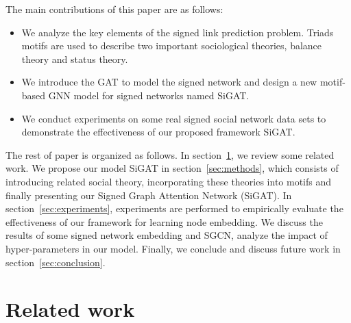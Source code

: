 \documentclass[runningheads]{llncs}
\begin{document}
The main contributions of this paper are as follows:

\begin{itemize}
    \item We analyze the key elements of the signed link prediction problem. Triads motifs are used to describe two important sociological theories, \ie balance theory and status theory.
    \item We introduce the GAT to model the signed network and design a new motif-based GNN model for signed networks named SiGAT.
    \item We conduct experiments on some real signed social network data sets to demonstrate the effectiveness of our proposed framework SiGAT.
\end{itemize}

The rest of paper is organized as follows. In section~\ref{sec:related_work}, we review some related work.
We propose our model SiGAT in section~\ref{sec:methods}, which consists of introducing related social theory, incorporating these theories into motifs and finally presenting our Signed Graph Attention Network (SiGAT).
In section~\ref{sec:experiments}, experiments are performed to empirically evaluate the effectiveness of our framework for learning node embedding.
We discuss the results of some signed network embedding and SGCN, analyze the impact of hyper-parameters in our model.
Finally, we conclude and discuss future work in section~\ref{sec:conclusion}.
 
\section{Related work}\label{sec:related_work}
\end{document}
